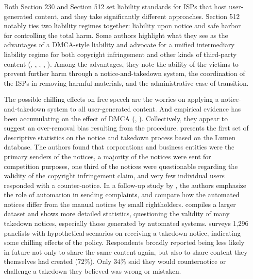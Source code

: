 Both Section 230 and Section 512 set liability standards for ISPs that host user-generated content, and they take significantly different approaches. 
Section 512 notably ties two liability regimes together: liability upon notice and safe harbor for controlling the total harm. 
Some authors highlight what they see as the advantages of a DMCA-style liability and advocate for a unified intermediary liability regime for both copyright infringement and other kinds of third-party content (, , , , ). Among the advantages, they note the ability of the victims to prevent further harm through a notice-and-takedown system, the coordination of the ISPs in removing harmful materials, and the administrative ease of transition.  


The possible chilling effects on free speech are the worries on applying a notice-and-takedown system to all user-generated content.
And empirical evidence has been accumulating on the effect of DMCA (, ). Collectively, they appear to suggest an over-removal bias resulting from the procedure.   
 presents the first set of descriptive statistics on the notice and takedown process based on the Lumen database. The authors found that corporations and business entities were the primary senders of the notices, a majority of the notices were sent for competition purposes, one third of the notices were questionable regarding the validity of the copyright infringement claim, and very few individual users responded with a counter-notice. 
In a follow-up study by , the authors emphasize the role of automation in sending complaints, and compare how the automated notices differ from the manual notices by small rightholders. 
 compiles a larger dataset and shows more detailed statistics, questioning the validity of many takedown notices, especially those generated by automated systems.
 surveys 1,296 panelists with hypothetical scenarios on receiving a takedown notice, indicating some chilling effects of the policy. Respondents broadly reported being less likely in future not only to share the same content again, but also to share content they themselves had created (72\%). Only 34\% said they would counternotice or challenge a takedown they believed was wrong or mistaken. 

